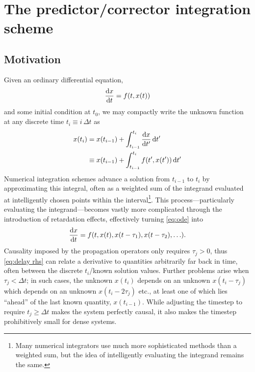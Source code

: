 \chapter{\label{appendix:predictor corrector}The predictor/corrector integration scheme}

\section{Motivation}

Given an ordinary differential equation,
\begin{equation}
  \dv{x}{t} = f(t, x(t))
  \label{eq:ode}
\end{equation}
and some initial condition at $t_0$, we may compactly write the unknown function at any discrete time $t_i \equiv i\,\Delta t$ as
\begin{equation}
  \begin{aligned}
    x(t_i) & = x(t_{i-1}) + \int_{t_{i-1}}^{t_i} \dv{x}{t'} \dd{t'} \\
    &                 \equiv x(t_{i-1}) + \int_{t_{i-1}}^{t_i} f(t', x(t')) \dd{t'}
    \label{eq:ode step}
  \end{aligned}
\end{equation}
Numerical integration schemes advance a solution from $t_{i-1}$ to $t_i$ by approximating this integral, often as a weighted sum of the integrand evaluated at intelligently chosen points within the interval\footnote{Many numerical integrators use much more sophisticated methods than a weighted sum, but the idea of intelligently evaluating the integrand remains the same.}.
This process---particularly evaluating the integrand---becomes vastly more complicated through the introduction of retardation effects, effectively turning \cref{eq:ode} into
\begin{equation}
  \dv{x}{t} = f(t, x(t), x(t - \tau_1), x(t - \tau_2), \ldots).
  \label{eq:delay rhs}
\end{equation}
Causality imposed by the propagation operators only requires $\tau_j > 0$, thus \cref{eq:delay rhs} can relate a derivative to quantities arbitrarily far back in time, often between the discrete $t_i$/known solution values.
Further problems arise when $\tau_j < \Delta t$; in such cases, the unknown $x(t_i)$ depends on an unknown $x(t_i - \tau_j)$ which depends on an unknown $x(t_i - 2 \tau_j)$ etc., at least one of which lies ``ahead'' of the last known quantity, $x(t_{i-1})$.
While adjusting the timestep to require $t_j \geqslant \Delta t$ makes the system perfectly causal, it also makes the timestep prohibitively small for dense systems.
